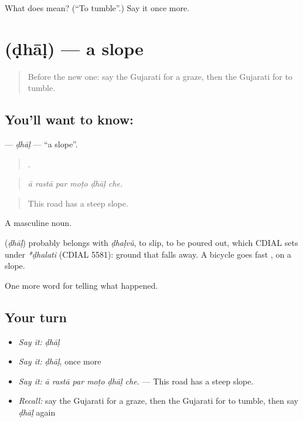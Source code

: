 \begin{tcolorbox}[breakable,colback=teal!4,colframe=teal!35!black,title={Before you move on}]
What does  mean? (\textquotedblleft{}To tumble\textquotedblright{}.) Say it once more.
\end{tcolorbox}
\section[\texorpdfstring{\gu{ઢાળ} (ḍhāḷ)}{ઢાળ (ḍhāḷ)}]{ (ḍhāḷ) — a slope}

\label{lesson:GU-C294-dhal}



\begin{quote}
Before the new one: say the Gujarati for a graze, then the Gujarati for to tumble.
\end{quote}

\subsection*{You'll want to know: }
\textbf{} — \emph{ḍhāḷ} — \textquotedblleft{}a slope\textquotedblright{}.

\begin{quote}
     .
\end{quote}

\begin{quote}
\emph{ā rastā par moṭo ḍhāḷ che.}
\end{quote}

\begin{quote}
This road has a steep slope.
\end{quote}

A masculine noun.

\begin{cousinweb}
\textbf{} (\emph{ḍhāḷ}) probably belongs with \emph{ḍhaḷvũ}, to slip, to be poured out, which CDIAL sets under \emph{*ḍhalati} (CDIAL 5581): ground that falls away. A bicycle goes fast \textbf{ }, on a slope.
\end{cousinweb}

\begin{grammarlens}[title={What you've built}]
One more word for telling what happened.
\end{grammarlens}

\subsection*{Your turn}
\begin{itemize}
\raggedright
  \item \emph{Say it:} \emph{ḍhāḷ}
  \item \emph{Say it:} \emph{ḍhāḷ}, once more
  \item \emph{Say it:} \emph{ā rastā par moṭo ḍhāḷ che.} — This road has a steep slope.
  \item \emph{Recall:} say the Gujarati for a graze, then the Gujarati for to tumble, then say \emph{ḍhāḷ} again
\end{itemize}

